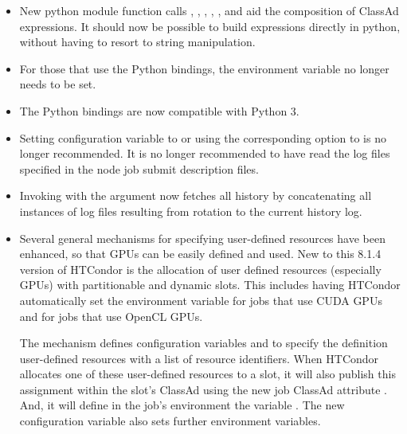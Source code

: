 \begin{itemize}
\item New python  module function calls 
, , ,
, , and 
aid the composition of ClassAd expressions.
It should now be possible to build expressions directly
in python, without having to resort to string manipulation.

\item For those that use the Python bindings,
the  environment variable no longer needs to be set.

\item The Python bindings are now compatible with Python 3.


\item Setting configuration variable
 to 
or using the corresponding  option
to  is no longer recommended.
It is no longer recommended to have  read the log files 
specified in the node job submit description files.

\item Invoking  with the  argument
now fetches all  history by concatenating all instances 
of log files resulting from rotation to the current history log.

\item Several general mechanisms for specifying user-defined  
resources have been enhanced,
so that GPUs can be easily defined and used.
New to this 8.1.4 version of HTCondor is the allocation of user defined
resources (especially GPUs) with partitionable and dynamic slots.
This includes having HTCondor automatically set the environment variable
 for jobs that use CUDA GPUs
and  for jobs that use OpenCL GPUs.

The mechanism defines configuration variables 
 and 
to specify the definition user-defined resources with a list of resource
identifiers.  
When HTCondor allocates one of these user-defined resources to a slot, 
it will also publish this assignment within the slot's ClassAd 
using the new job ClassAd attribute .
And, it will define in the job's environment the variable
.
The new configuration variable 
also sets further environment variables.


\end{itemize}
